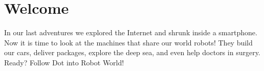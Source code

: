 \documentclass[11pt,openany]{book}
\begin{document}
\section*{Welcome}
In our last adventures we explored the Internet and shrunk inside a smartphone.
Now it is time to look at the machines that share our world \textemdash{} robots!
They build our cars, deliver packages, explore the deep sea, and even help
doctors in surgery. Ready? Follow Dot into Robot World!

\tableofcontents

\mainmatter











\backmatter
\end{document}
